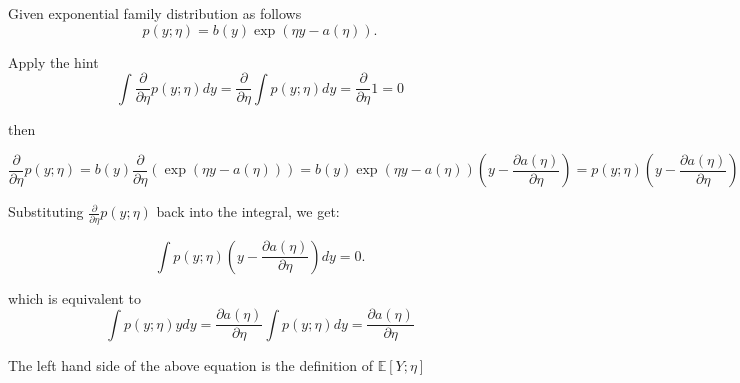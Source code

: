 \begin{answer}

Given exponential family distribution as follows
\begin{equation*}
p(y ; \eta) = b(y)\exp(\eta y - a(\eta)).
\end{equation*}

Apply the hint
\begin{equation*}
\int \frac{\partial}{\partial \eta} p(y; \eta)dy = \frac{\partial}{\partial \eta} \int p(y; \eta)dy = \frac{\partial}{\partial \eta} 1 = 0
\end{equation*}

then 

\begin{equation*}
\frac{\partial}{\partial \eta} p(y; \eta) 
= b(y) \frac{\partial}{\partial \eta} \left( \exp(\eta y - a(\eta)) \right) = b(y) \exp(\eta y - a(\eta)) \left( y - \frac{\partial a(\eta)}{\partial \eta} \right) = p(y; \eta) \left( y - \frac{\partial a(\eta)}{\partial \eta} \right) 
\end{equation*}
        

Substituting $\frac{\partial}{\partial \eta} p(y; \eta)$ back into the integral, we get:

\begin{equation*}
\int p(y; \eta) \left( y - \frac{\partial a(\eta)}{\partial \eta} \right) dy = 0.
\end{equation*}

which is equivalent to 
\begin{equation*}
    \int p(y; \eta)ydy = \frac{\partial a(\eta)}{\partial \eta} \int p(y; \eta)dy = \frac{\partial a(\eta)}{\partial \eta}
\end{equation*}

The left hand side of the above equation is the definition of $\mathbb{E}[Y; \eta]$

\end{answer}
